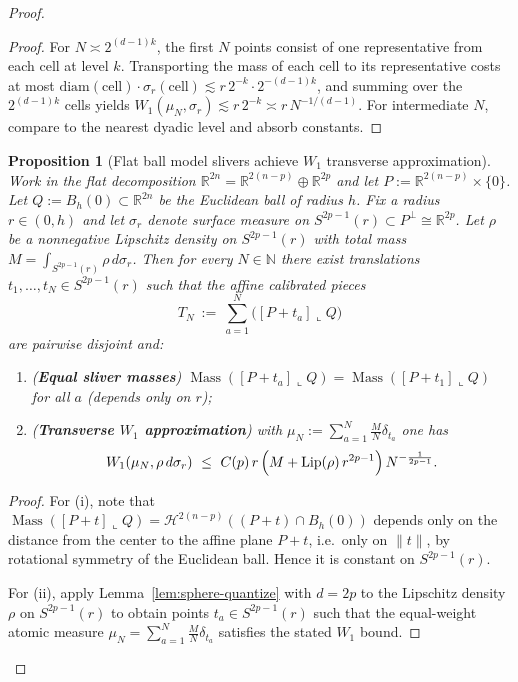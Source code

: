 \documentclass[11pt]{article}
\numberwithin{equation}{section}  %
\theoremstyle{plain}
\newtheorem{proposition}[theorem]{Proposition}
\theoremstyle{definition}
\theoremstyle{remark}
\newcommand{\R}{\mathbb{R}}
\newcommand{\N}{\mathbb{N}}
\DeclareMathOperator{\Mass}{Mass}
\begin{document}
\begin{proof}
\begin{proof}
For $N\asymp 2^{(d-1)k}$, the first $N$ points consist of one representative from each cell at level $k$.
Transporting the mass of each cell to its representative costs at most $\mathrm{diam}(\text{cell})\cdot\sigma_r(\text{cell})\lesssim r\,2^{-k}\cdot 2^{-(d-1)k}$,
and summing over the $2^{(d-1)k}$ cells yields $W_1(\mu_N,\sigma_r)\lesssim r\,2^{-k}\asymp r\,N^{-1/(d-1)}$.
For intermediate $N$, compare to the nearest dyadic level and absorb constants.
\end{proof}




\begin{proposition}[Flat ball model slivers achieve $W_1$ transverse approximation]\label{prop:flat-sliver-local}
Work in the flat decomposition $\R^{2n}=\R^{2(n-p)}\oplus\R^{2p}$ and let $P:=\R^{2(n-p)}\times\{0\}$.
Let $Q:=B_h(0)\subset\R^{2n}$ be the Euclidean ball of radius $h$.
Fix a radius $r\in(0,h)$ and let $\sigma_r$ denote surface measure on $S^{2p-1}(r)\subset P^\perp\cong\R^{2p}$.
Let $\rho$ be a nonnegative Lipschitz density on $S^{2p-1}(r)$ with total mass
$M=\int_{S^{2p-1}(r)}\rho\,d\sigma_r$.
Then for every $N\in\N$ there exist translations $t_1,\dots,t_N\in S^{2p-1}(r)$ such that the affine calibrated pieces
\[
T_N\ :=\ \sum_{a=1}^N \bigl([P+t_a]\llcorner Q\bigr)
\]
are pairwise disjoint and:
\begin{enumerate}
\item[\textnormal{(i)}] (\textbf{Equal sliver masses}) $\Mass([P+t_a]\llcorner Q)=\Mass([P+t_1]\llcorner Q)$ for all $a$ (depends only on $r$);
\item[\textnormal{(ii)}] (\textbf{Transverse $W_1$ approximation}) with $\mu_N:=\sum_{a=1}^N \frac{M}{N}\delta_{t_a}$ one has
\[
W_1(\mu_N,\rho\,d\sigma_r)\ \le\ C(p)\,r\,\Bigl(M+\mathrm{Lip}(\rho)\,r^{2p-1}\Bigr)\,N^{-\frac{1}{2p-1}}.
\]
\end{enumerate}
\end{proposition}


\begin{proof}
For \textnormal{(i)}, note that $\Mass([P+t]\llcorner Q)=\mathcal H^{2(n-p)}((P+t)\cap B_h(0))$ depends only on the distance from the center to the affine plane
$P+t$, i.e.\ only on $\|t\|$, by rotational symmetry of the Euclidean ball.  Hence it is constant on $S^{2p-1}(r)$.

For \textnormal{(ii)}, apply Lemma~\ref{lem:sphere-quantize} with $d=2p$ to the Lipschitz density $\rho$ on $S^{2p-1}(r)$ to obtain points $t_a\in S^{2p-1}(r)$
such that the equal-weight atomic measure $\mu_N=\sum_{a=1}^N \frac{M}{N}\delta_{t_a}$ satisfies the stated $W_1$ bound.


\end{proof}
\end{proof}
\end{document}
